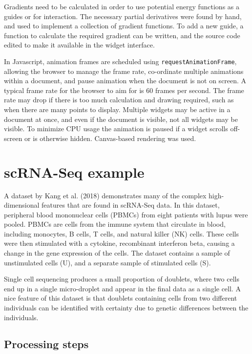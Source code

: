 Gradients need to be calculated in order to use potential energy functions as a guides or for interaction. The necessary partial derivatives were found by hand, and used to implement a collection of gradient functions. To add a new guide, a function to calculate the required gradient can be written, and the source code edited to make it available in the widget interface.

In Javascript, animation frames are scheduled using \texttt{requestAnimationFrame}, allowing the browser to manage the frame rate, co-ordinate multiple animations within a document, and pause animation when the document is not on screen. A typical frame rate for the browser to aim for is 60 frames per second. The frame rate may drop if there is too much calculation and drawing required, such as when there are many points to display. Multiple widgets may be active in a document at once, and even if the document is visible, not all widgets may be visible. To minimize CPU usage the animation is paused if a widget scrolls off-screen or is otherwise hidden. Canvas-based rendering was used.

\hypertarget{scrna-seq-example}{%
\section{scRNA-Seq example}\label{scrna-seq-example}}

A dataset by Kang et al. (2018) demonstrates many of the complex high-dimensional features that are found in scRNA-Seq data. In this dataset, peripheral blood mononuclear cells (PBMCs) from eight patients with lupus were pooled. PBMCs are cells from the immune system that circulate in blood, including monocytes, B cells, T cells, and natural killer (NK) cells. These cells were then stimulated with a cytokine, recombinant interferon beta, causing a change in the gene expression of the cells. The dataset contains a sample of unstimulated cells (U), and a separate sample of stimulated cells (S).

Single cell sequencing produces a small proportion of doublets, where two cells end up in a single micro-droplet and appear in the final data as a single cell. A nice feature of this dataset is that doublets containing cells from two different individuals can be identified with certainty due to genetic differences between the individuals.

\hypertarget{processing-steps}{%
\subsection{Processing steps}\label{processing-steps}}

